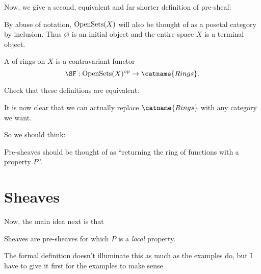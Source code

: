\documentclass[11pt]{scrreprt}
\begin{document}
Now, we give a second, equivalent and far shorter definition of pre-sheaf:
\begin{abuse}
	By abuse of notation, $\operatorname{OpenSets}(X)$ will also be thought of as a
	posetal category by inclusion. Thus $\varnothing$ is an initial object
	and the entire space $X$ is a terminal object.
\end{abuse}
\begin{definition}
	A  of rings on $X$ is a contravariant functor
	\[ \SF : \Opens(X)\op \to \catname{Rings}. \]
\end{definition}
\begin{ques}
	Check that these definitions are equivalent.
\end{ques}
It is now clear that we can actually replace $\catname{Rings}$
with any category we want.

So we should think:
\begin{moral}
	Pre-sheaves should be thought of as
	``returning the ring of functions with a property $P$''.
\end{moral}

\section{Sheaves}

Now, the main idea next is that
\begin{moral}
	Sheaves are pre-sheaves for which $P$ is a \emph{local} property.
\end{moral}

The formal definition doesn't illuminate this as much as the examples
do, but I have to give it first for the examples to make sense.
\end{document}
